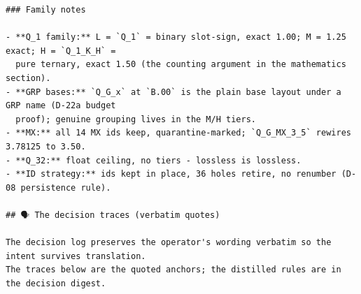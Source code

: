 \begin{Verbatim}[breaklines,breakanywhere,fontsize=\footnotesize]
### Family notes

- **Q_1 family:** L = `Q_1` = binary slot-sign, exact 1.00; M = 1.25 exact; H = `Q_1_K_H` =
  pure ternary, exact 1.50 (the counting argument in the mathematics section).
- **GRP bases:** `Q_G_x` at `B.00` is the plain base layout under a GRP name (D-22a budget
  proof); genuine grouping lives in the M/H tiers.
- **MX:** all 14 MX ids keep, quarantine-marked; `Q_G_MX_3_5` rewires 3.78125 to 3.50.
- **Q_32:** float ceiling, no tiers - lossless is lossless.
- **ID strategy:** ids kept in place, 36 holes retire, no renumber (D-08 persistence rule).

## 🗣️ The decision traces (verbatim quotes)

The decision log preserves the operator's wording verbatim so the intent survives translation.
The traces below are the quoted anchors; the distilled rules are in the decision digest.


\end{Verbatim}
